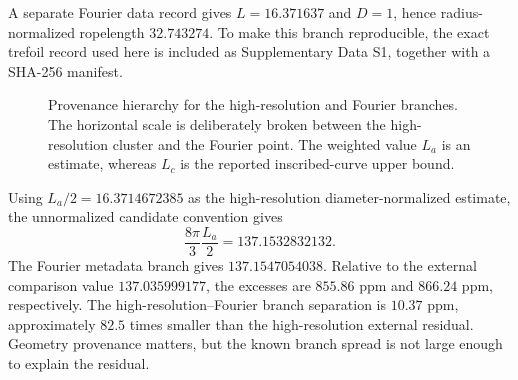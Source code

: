 \documentclass[aps,pre,preprint,notitlepage,nofootinbib,superscriptaddress]{revtex4-2}
\begin{document}
A separate Fourier data record gives $L=16.371637$ and $D=1$, hence radius-normalized ropelength $32.743274$.  To make this branch reproducible, the exact trefoil record used here is included as Supplementary Data S1, together with a SHA-256 manifest.


\begin{figure}[t]
\centering
{}
\caption{Provenance hierarchy for the high-resolution and Fourier branches.  The horizontal scale is deliberately broken between the high-resolution cluster and the Fourier point.  The weighted value $L_a$ is an estimate, whereas $L_c$ is the reported inscribed-curve upper bound.}
\label{fig:provenance-v020}
\end{figure}


Using $L_a/2=16.3714672385$ as the high-resolution diameter-normalized estimate, the unnormalized candidate convention gives
\begin{equation}
  \frac{8\pi}{3}\frac{L_a}{2}=137.1532832132.
\end{equation}
The Fourier metadata branch gives $137.1547054038$.  Relative to the external comparison value $137.035999177$, the excesses are $855.86$ ppm and $866.24$ ppm, respectively.  The high-resolution--Fourier branch separation is $10.37$ ppm, approximately $82.5$ times smaller than the high-resolution external residual.  Geometry provenance matters, but the known branch spread is not large enough to explain the residual.
\end{document}
